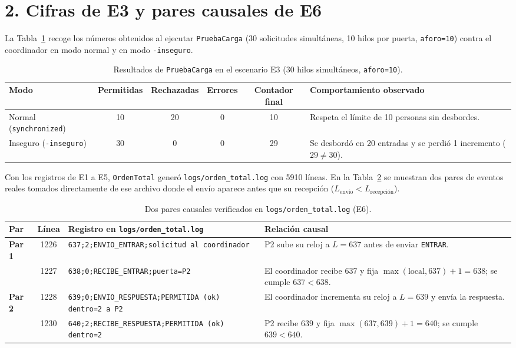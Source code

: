 \documentclass[10pt,a4paper]{article}
\begin{document}
\section*{2. Cifras de E3 y pares causales de E6}
\vspace{-0.15cm}

La Tabla~\ref{tab:e3} recoge los números obtenidos al ejecutar \texttt{PruebaCarga} (30 solicitudes simultáneas, 10 hilos por puerta, \texttt{aforo=10}) contra el coordinador en modo normal y en modo \texttt{-inseguro}.

\begin{table}[htbp]
\centering
\caption{Resultados de \texttt{PruebaCarga} en el escenario E3 (30 hilos simultáneos, \texttt{aforo=10}).}
\label{tab:e3}
\footnotesize
\begin{tabularx}{\textwidth}{l c c c c X}
\toprule
\textbf{Modo} & \textbf{Permitidas} & \textbf{Rechazadas} & \textbf{Errores} & \textbf{Contador final} & \textbf{Comportamiento observado} \\
\midrule
Normal (\texttt{synchronized}) & 10 & 20 & 0 & 10 & Respeta el límite de 10 personas sin desbordes. \\
Inseguro (\texttt{-inseguro}) & 30 & 0 & 0 & 29 & Se desbordó en 20 entradas y se perdió 1 incremento ($29 \neq 30$). \\
\bottomrule
\end{tabularx}
\end{table}

Con los registros de E1 a E5, \texttt{OrdenTotal} generó \texttt{logs/orden\_total.log} con 5910 líneas. En la Tabla~\ref{tab:causales} se muestran dos pares de eventos reales tomados directamente de ese archivo donde el envío aparece antes que su recepción ($L_{\text{envío}} < L_{\text{recepción}}$).

\begin{table}[htbp]
\centering
\caption{Dos pares causales verificados en \texttt{logs/orden\_total.log} (E6).}
\label{tab:causales}
\scriptsize
\setlength{\tabcolsep}{4pt}
\begin{tabularx}{\textwidth}{>{\bfseries}l c >{\raggedright\arraybackslash}p{6.6cm} X}
\toprule
Par & Línea & Registro en \texttt{logs/orden\_total.log} & Relación causal \\
\midrule
Par 1 & 1226 & \texttt{637;2;ENVIO\_ENTRAR;solicitud al coordinador} & P2 sube su reloj a $L=637$ antes de enviar \texttt{ENTRAR}. \\
      & 1227 & \texttt{638;0;RECIBE\_ENTRAR;puerta=P2} & El coordinador recibe $637$ y fija $\max(\text{local},637)+1=638$; se cumple $637 < 638$. \\
\midrule
Par 2 & 1228 & \texttt{639;0;ENVIO\_RESPUESTA;PERMITIDA (ok) dentro=2 a P2} & El coordinador incrementa su reloj a $L=639$ y envía la respuesta. \\
      & 1230 & \texttt{640;2;RECIBE\_RESPUESTA;PERMITIDA (ok) dentro=2} & P2 recibe $639$ y fija $\max(637,639)+1=640$; se cumple $639 < 640$. \\
\bottomrule
\end{tabularx}
\end{table}
\end{document}
